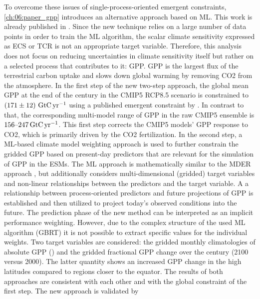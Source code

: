 To overcome these issues of single-process-oriented emergent constraints,
\cref{ch:06:paper_gpp} introduces an alternative approach based on \ac{ML}.
This work is already published in \textcite{Schlund2020}. Since the new
technique relies on a large number of data points in order to train the \ac{ML}
algorithm, the scalar climate sensitivity expressed as \ac{ECS} or \ac{TCR} is
not an appropriate target variable. Therefore, this analysis does not focus on
reducing uncertainties in climate sensitivity itself but rather on a selected
process that contributes to it: \ac{GPP}. \Ac{GPP} is the largest flux of the
terrestrial carbon uptake and slows down global warming by removing \ac{CO2}
from the atmosphere. In the first step of the new two-step approach, the global
mean \ac{GPP} at the end of the  century in the \acs{CMIP}5
\acs{RCP}8.5 scenario is constrained to $\pmrangeunit{171}{12}{\GtCyr{}}$ using
a published emergent constraint by \textcite{Wenzel2016}. In contrast to that,
the corresponding multi-model range of \ac{GPP} in the raw \acs{CMIP}5 ensemble
is $\rangeunit{156}{247}{\GtCyr{}}$. This first step corrects the \acs{CMIP}5
models' \ac{GPP} response to \ac{CO2}, which is primarily driven by the
\ac{CO2} fertilization. In the second step, a \ac{ML}-based climate model
weighting approach is used to further constrain the gridded \ac{GPP} based on
present-day predictors that are relevant for the simulation of \ac{GPP} in the
\acp{ESM}. The \ac{ML} approach is mathematically similar to the \ac{MDER}
approach \autocite{Karpechko2013, Senftleben2020, Wenzel2016a}, but
additionally considers multi-dimensional (gridded) target variables and
non-linear relationships between the predictors and the target variable. A a
relationship between process‐oriented predictors and future projections of
\ac{GPP} is established and then utilized to project today's observed
conditions into the future. The prediction phase of the new method can be
interpreted as an implicit performance weighting. However, due to the complex
structure of the used \ac{ML} algorithm (\ac{GBRT}) it is not possible to
extract specific values for the individual weights. Two target variables are
considered: the gridded monthly climatologies of absolute \ac{GPP}
() and the gridded fractional \ac{GPP} change over the
 century (2100 versus 2000). The latter quantity shows an increased
\acs{GPP} change in the high latitudes compared to regions closer to the
equator. The results of both approaches are consistent with each other and with
the global constraint of the first step. The new approach is validated by
